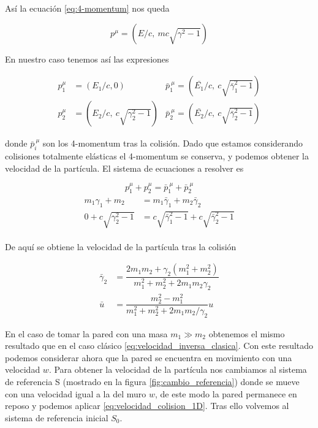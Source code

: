 Así la ecuación \ref{eq:4-momentum} nos queda

\begin{equation}
    p^\mu = \left( E/c, \: mc\sqrt{\gamma^2 -1} \right)
\end{equation}

En nuestro caso tenemos así las expresiones

\begin{align}
    p^\mu_1 &= \left( E_1/c, 0 \right)  &\bar{p}^{\:\mu}_1 = \left( \bar{E_1}/c, \: c\sqrt{\bar{\gamma}^2_1 -1}  \right) \nonumber \\
    p^\mu_2 &= \left( E_2/c, \: c\sqrt{\gamma^2_2 -1} \right)   &\bar{p}^{\:\mu}_2 = \left( \bar{E_2}/c, \: c\sqrt{\bar{\gamma}^2_2 -1}  \right) \nonumber
\end{align}

donde \( \bar{p}^{\:\mu}_i \) son los 4-momentum tras la colisión. Dado que estamos considerando colisiones totalmente elásticas el 4-momentum se conserva, y podemos obtener la velocidad de la partícula. El sistema de ecuaciones a resolver es

\begin{equation}
    p^\mu_1 + p^\mu_2 = \bar{p}^{\:\mu}_1 + \bar{p}^{\:\mu}_2
\end{equation}
\begin{align}
        \begin{split}
            m_1\gamma_1 + m_2 &= m_1\bar{\gamma}_1 + m_2\bar{\gamma}_2 \\[1mm]
        0 + c\sqrt{\gamma^2_2 -1} &= c\sqrt{\bar{\gamma}^2_1 -1} + c\sqrt{\bar{\gamma}^2_2 -1}
        \end{split}
\end{align}

De aquí se obtiene la velocidad de la partícula tras la colisión

\begin{align}\label{eq:velocidad_colision_1D}
    \bar{\gamma}_2 &= \dfrac{2 m_1 m_2 + \gamma_2(m_1^2 + m_2^2)}{m_1^2+m_2^2+2 m_1 m_2 \gamma_2} \\[3mm]
    \bar{u} &= \dfrac{m_2^2 - m_1^2}{m_1^2 + m_2^2 + 2 m_1 m_2 / \gamma_2}u
\end{align}

En el caso de tomar la pared con una masa \( m_1 \gg m_2 \) obtenemos el mismo resultado que en el caso clásico \ref{eq:velocidad_inversa_clasica}. Con este resultado podemos considerar ahora que la pared se encuentra en movimiento con una velocidad \( w \). Para obtener la velocidad de la partícula nos cambiamos al sistema de referencia S (mostrado en la figura \ref{fig:cambio_referencia}) donde se mueve con una velocidad igual a la del muro \( w \), de este modo la pared permanece en reposo y podemos aplicar \ref{eq:velocidad_colision_1D}. Tras ello volvemos al sistema de referencia inicial \( S_0 \).


